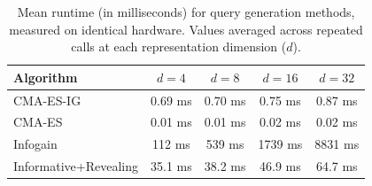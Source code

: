 \begin{table}[t]
\centering
\caption{Mean runtime (in milliseconds) for query generation methods, measured on identical hardware. Values averaged across repeated calls at each representation dimension ($d$).}
\label{tab:runtime}
\begin{tabular}{l cccc}
\toprule
\textbf{Algorithm} & $d=4$ & $d=8$ & $d=16$ & $d=32$ \\
\midrule
CMA-ES-IG & 0.69 ms & 0.70 ms & 0.75 ms & 0.87 ms \\
CMA-ES & 0.01 ms & 0.01 ms & 0.02 ms & 0.02 ms \\
Infogain & 112 ms & 539 ms & 1739 ms & 8831 ms \\
Informative+Revealing & 35.1 ms & 38.2 ms & 46.9 ms & 64.7 ms \\
\bottomrule
\end{tabular}
\end{table}
